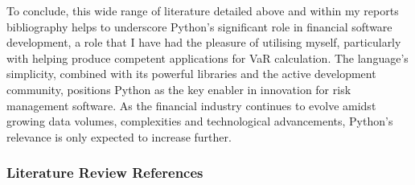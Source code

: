 \documentclass{article}
\begin{document}
To conclude, this wide range of literature detailed above and within my reports bibliography helps to underscore Python's significant role in financial software development, a role that I have had the pleasure of utilising myself, particularly with helping produce competent applications for VaR calculation. The language's simplicity, combined with its powerful libraries and the active development community, positions Python as the key enabler in innovation for risk management software. As the financial industry continues to evolve amidst growing data volumes, complexities and technological advancements, Python's relevance is only expected to increase further.

\subsubsection{Literature Review References}
\end{document}
